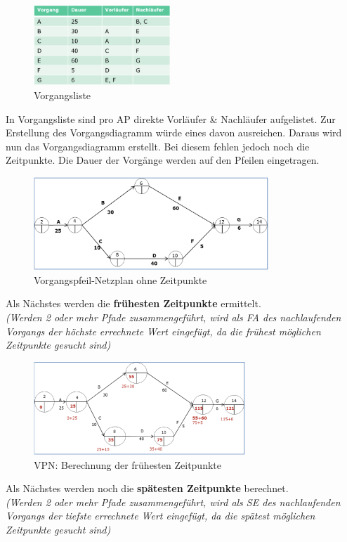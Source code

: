 \documentclass[a4paper]{article}
\begin{document}
			\begin{figure}[!htb]
				\centering
				\includegraphics[height=3cm]{img/pm/cpm_vorgangsliste.png}
				\caption{Vorgangsliste}
				\label{fig:pm_cpm_vorgangsliste}
			\end{figure}
			\noindent
			In Vorgangsliste sind pro AP direkte Vorläufer \& Nachläufer aufgelistet.
			Zur Erstellung des Vorgangsdiagramm würde eines davon ausreichen.
			Daraus wird nun das Vorgangsdiagramm erstellt.
			Bei diesem fehlen jedoch noch die Zeitpunkte.
			Die Dauer der Vorgänge werden auf den Pfeilen eingetragen.
			
			\newpage
			
			\begin{figure}[!htb]
				\centering
				\includegraphics[height=3.5cm]{img/pm/cpm_netzplan.png}
				\caption{Vorgangspfeil-Netzplan ohne Zeitpunkte}
				\label{fig:pm_cpm_netzplan}
			\end{figure}
			\noindent
			Als Nächstes werden die \textbf{frühesten Zeitpunkte} ermittelt.\\
			\textit{(Werden 2 oder mehr Pfade zusammengeführt, wird als FA des nachlaufenden Vorgangs der höchste errechnete Wert eingefügt, da die frühest möglichen Zeitpunkte gesucht sind)}
			
			\begin{figure}[!htb]
				\centering
				\includegraphics[height=3.5cm]{img/pm/cpm_soonest.png}
				\caption{VPN: Berechnung der frühesten Zeitpunkte}
				\label{fig:pm_cpm_soonest}
			\end{figure}
			\noindent
			Als Nächstes werden noch die \textbf{spätesten Zeitpunkte} berechnet.\\
			\textit{(Werden 2 oder mehr Pfade zusammengeführt, wird als SE des nachlaufenden Vorgangs der tiefste errechnete Wert eingefügt, da die spätest möglichen Zeitpunkte gesucht sind)}
			
\end{document}
